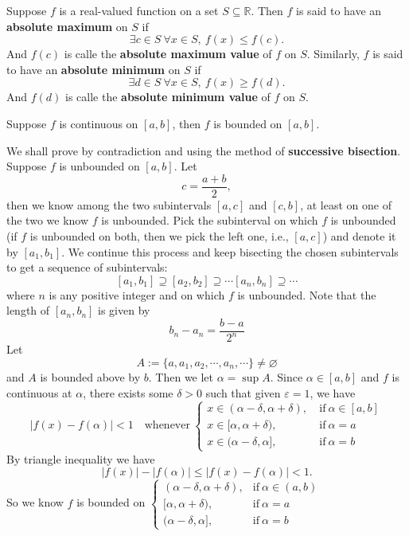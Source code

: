 	\begin{definitionenv}
		Suppose $f$ is a real-valued function on a set $S\subseteq \mathbb{R}$. Then $f$ is said to have an \textbf{absolute maximum} on $S$ if
		\[
		\exists c \in S\ \forall x\in S,\ f(x)\le f(c).
		\]
		And $f(c)$ is calle the \textbf{absolute maximum value} of $f$ on $S$. Similarly, $f$ is said to have an \textbf{absolute minimum} on $S$ if
		\[
		\exists d \in S\ \forall x\in S,\ f(x)\ge f(d).
		\]
		And $f(d)$ is calle the \textbf{absolute minimum value} of $f$ on $S$.
	\end{definitionenv}
	\begin{lemmaenv}
		Suppose $f$ is continuous on $[a,b]$, then $f$ is bounded on $[a,b]$.
	\end{lemmaenv}
	\begin{proofenv}
		We shall prove by contradiction and using the method of \textbf{successive bisection}. Suppose $f$ is unbounded on $[a,b]$. Let
		\[ c= \frac{a+b}{2},\]
		then we know among the two subintervals $[a,c]$ and $[c,b]$, at least on one of the two we know $f$ is unbounded. Pick the subinterval on which $f$ is unbounded (if $f$ is unbounded on both, then we pick the left one, i.e., $[a,c]$) and denote it by $[a_1,b_1]$. We continue this process and keep bisecting the chosen subintervals to get a sequence of subintervals:
		\[
		[a_1,b_1]\supseteq [a_2,b_2]\supseteq \cdots [a_n,b_n] \supseteq \cdots
		\]
		where $n$ is any positive integer and on which $f$ is unbounded. Note that the length of $[a_n,b_n]$ is given by
		\[
		b_n - a_n = \frac{b-a}{2^n}
		\]
		Let
		\[
		A:=\{a,a_1,a_2,\cdots,a_n,\cdots\}\neq \varnothing
		\]
		and $A$ is bounded above by $b$. Then we let $\alpha=\sup A$. Since $\alpha \in [a,b]$ and $f$ is continuous at $\alpha$, there exists some $\delta>0$ such that given $\varepsilon = 1$, we have
		\[
		|f(x)-f(\alpha)|<1\quad \text{whenever}\ 
		\begin{cases}
		x\in (\alpha-\delta, \alpha + \delta),\ &\text{if}\ \alpha\in [a,b]\\[4pt]
		x \in [\alpha, \alpha + \delta),\ &\text{if}\ \alpha=a\\[4pt]
		x \in (\alpha - \delta, \alpha],\ &\text{if}\ \alpha=b
		\end{cases}
		\]
		By triangle inequality we have
		\[
		|f(x)|-|f(\alpha)| \le |f(x)-f(\alpha)|<1.
		\]
		So we know $f$ is bounded on
		\(
		\begin{cases}
			(\alpha-\delta, \alpha + \delta), & \text{if}\ \alpha\in (a,b)\\[4pt]
			[\alpha, \alpha + \delta), & \text{if}\ \alpha=a\\[4pt]
			(\alpha - \delta, \alpha], & \text{if}\ \alpha=b
		\end{cases}
		\)
		

\end{proofenv}
